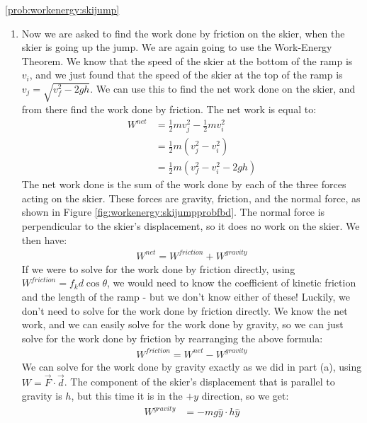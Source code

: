 \begin{solution}{\ref{prob:workenergy:skijump}}
\begin{enumerate}[label=\alph*)]
\begin{align*}
\frac{1}{2}v_j^2&=\frac{1}{2}v_f^2-gh\\
v_j&=\sqrt{v_f^2-2gh}
\end{align*}
$\therefore$ the speed of the skier the instant they leave the jump is $\sqrt{v_f^2-2gh}$.
\item Now we are asked to find the work done by friction on the skier, when the skier is going up the jump. We are again going to use the Work-Energy Theorem. We know that the speed of the skier at the bottom of the ramp is $v_i$, and we just found that the speed of the skier at the top of the ramp is $v_j=\sqrt{v_f^2-2gh}$. We can use this to find the net work done on the skier, and from there find the work done by friction. The net work is equal to:
\begin{align*}
W^{net}&=\frac{1}{2}mv_j^2-\frac{1}{2}mv_i^2\\
&=\frac{1}{2}m(v_j^2-v_i^2)\\
&=\frac{1}{2}m(v_f^2-v_i^2-2gh)
\end{align*}
The net work done is the sum of the work done by each of the three forces acting on the skier. These forces are gravity, friction, and the normal force, as shown in Figure \ref{fig:workenergy:skijumpprobfbd}.
The normal force is perpendicular to the skier's displacement, so it does no work on the skier. We then have:
\begin{align*}
W^{net}=W^{friction}+W^{gravity}
\end{align*}
If we were to solve for the work done by friction directly, using $W^{friction}=f_kd\cos\theta$, we would need to know the coefficient of kinetic friction and the length of the ramp - but we don't know either of these! Luckily, we don't need to solve for the work done by friction directly. We know the net work, and we can easily solve for the work done by gravity, so we can just solve for the work done by friction by rearranging the above formula:
\begin{align*}
W^{friction}=W^{net}-W^{gravity}
\end{align*}
We can solve for the work done by gravity exactly as we did in part (a), using $W=\vec F \cdot \vec d$. The component of the skier's displacement that is parallel to gravity is $h$, but this time it is in the $+y$ direction, so we get:
\begin{align*}
W^{gravity}&=-mg\hat y \cdot h\hat y\\

\end{align*}
\end{enumerate}
\end{solution}
